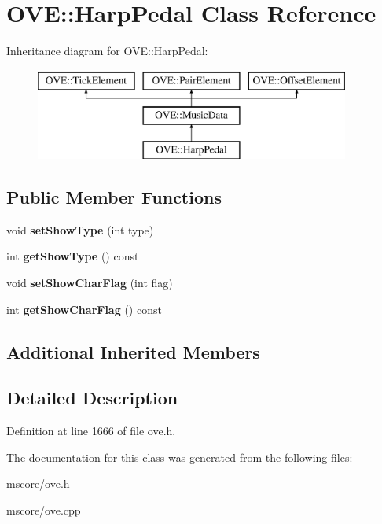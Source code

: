 \hypertarget{class_o_v_e_1_1_harp_pedal}{}\section{O\+VE\+:\+:Harp\+Pedal Class Reference}
\label{class_o_v_e_1_1_harp_pedal}
Inheritance diagram for O\+VE\+:\+:Harp\+Pedal\+:\begin{figure}[H]
\begin{center}
\leavevmode
\includegraphics[height=3.000000cm]{class_o_v_e_1_1_harp_pedal}
\end{center}
\end{figure}
\subsection*{Public Member Functions}
\begin{DoxyCompactItemize}
\item 
\mbox{\label{class_o_v_e_1_1_harp_pedal_a51b68cb8d719809f228e91108e0f09d2}} 
void {\bfseries set\+Show\+Type} (int type)
\item 
\mbox{\label{class_o_v_e_1_1_harp_pedal_a03b4ab52e215ee0992422d09049e71ff}} 
int {\bfseries get\+Show\+Type} () const
\item 
\mbox{\label{class_o_v_e_1_1_harp_pedal_a0fbc0e66b0ae51f3034b65b75fc52f6e}} 
void {\bfseries set\+Show\+Char\+Flag} (int flag)
\item 
\mbox{\label{class_o_v_e_1_1_harp_pedal_aed90d6c1b7582dd74e6d532c9a403517}} 
int {\bfseries get\+Show\+Char\+Flag} () const
\end{DoxyCompactItemize}
\subsection*{Additional Inherited Members}


\subsection{Detailed Description}


Definition at line 1666 of file ove.\+h.



The documentation for this class was generated from the following files\+:\begin{DoxyCompactItemize}
\item 
mscore/ove.\+h\item 
mscore/ove.\+cpp\end{DoxyCompactItemize}
